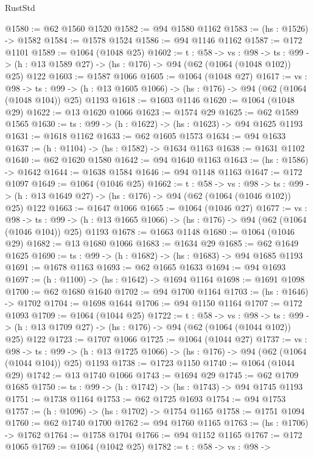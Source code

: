 \begin{lexlean}{RustStd}
\begin{coremodule}
@1580 := @62 @1560 @1520
@1582 := @94 @1580 @1162
@1583 := (hs : @1526) -> @1582
@1584 := @1578 @1524
@1586 := @94 @1146 @1162
@1587 := @172 @1101
@1589 := @1064 (@1048 @25)
@1602 := {t : @58} ->
  {vs : @98} ->
  {ts : @99} -> (h : @13 @1589 @27) -> (hs : @176) -> @94 (@62 (@1064 (@1048 @102)) @25) @122
@1603 := @1587 @1066
@1605 := @1064 (@1048 @27)
@1617 := {vs : @98} ->
  {ts : @99} -> (h : @13 @1605 @1066) -> (hs : @176) -> @94 (@62 (@1064 (@1048 @104)) @25) @1193
@1618 := @1603 @1146
@1620 := @1064 (@1048 @29)
@1622 := @13 @1620 @1066
@1623 := @1574 @29
@1625 := @62 @1589 @1565
@1630 := {ts : @99} -> (h : @1622) -> (hs : @1623) -> @94 @1625 @1193
@1631 := @1618 @1162
@1633 := @62 @1605 @1573
@1634 := @94 @1633
@1637 := (h : @1104) -> (hs : @1582) -> @1634 @1163
@1638 := @1631 @1102
@1640 := @62 @1620 @1580
@1642 := @94 @1640 @1163
@1643 := (hs : @1586) -> @1642
@1644 := @1638 @1584
@1646 := @94 @1148 @1163
@1647 := @172 @1097
@1649 := @1064 (@1046 @25)
@1662 := {t : @58} ->
  {vs : @98} ->
  {ts : @99} -> (h : @13 @1649 @27) -> (hs : @176) -> @94 (@62 (@1064 (@1046 @102)) @25) @122
@1663 := @1647 @1066
@1665 := @1064 (@1046 @27)
@1677 := {vs : @98} ->
  {ts : @99} -> (h : @13 @1665 @1066) -> (hs : @176) -> @94 (@62 (@1064 (@1046 @104)) @25) @1193
@1678 := @1663 @1148
@1680 := @1064 (@1046 @29)
@1682 := @13 @1680 @1066
@1683 := @1634 @29
@1685 := @62 @1649 @1625
@1690 := {ts : @99} -> (h : @1682) -> (hs : @1683) -> @94 @1685 @1193
@1691 := @1678 @1163
@1693 := @62 @1665 @1633
@1694 := @94 @1693
@1697 := (h : @1100) -> (hs : @1642) -> @1694 @1164
@1698 := @1691 @1098
@1700 := @62 @1680 @1640
@1702 := @94 @1700 @1164
@1703 := (hs : @1646) -> @1702
@1704 := @1698 @1644
@1706 := @94 @1150 @1164
@1707 := @172 @1093
@1709 := @1064 (@1044 @25)
@1722 := {t : @58} ->
  {vs : @98} ->
  {ts : @99} -> (h : @13 @1709 @27) -> (hs : @176) -> @94 (@62 (@1064 (@1044 @102)) @25) @122
@1723 := @1707 @1066
@1725 := @1064 (@1044 @27)
@1737 := {vs : @98} ->
  {ts : @99} -> (h : @13 @1725 @1066) -> (hs : @176) -> @94 (@62 (@1064 (@1044 @104)) @25) @1193
@1738 := @1723 @1150
@1740 := @1064 (@1044 @29)
@1742 := @13 @1740 @1066
@1743 := @1694 @29
@1745 := @62 @1709 @1685
@1750 := {ts : @99} -> (h : @1742) -> (hs : @1743) -> @94 @1745 @1193
@1751 := @1738 @1164
@1753 := @62 @1725 @1693
@1754 := @94 @1753
@1757 := (h : @1096) -> (hs : @1702) -> @1754 @1165
@1758 := @1751 @1094
@1760 := @62 @1740 @1700
@1762 := @94 @1760 @1165
@1763 := (hs : @1706) -> @1762
@1764 := @1758 @1704
@1766 := @94 @1152 @1165
@1767 := @172 @1065
@1769 := @1064 (@1042 @25)
@1782 := {t : @58} ->
  {vs : @98} ->

\end{coremodule}
\end{lexlean}
